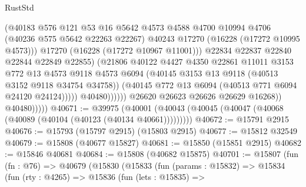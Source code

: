 \begin{lexlean}{RustStd}
\begin{coremodule}
                                      (@40183
                                        @576
                                        @121
                                        @53
                                        @16
                                        @5642
                                        @4573
                                        @4588
                                        @4700
                                        @10994
                                        @4706
                                        (@40236 @575 @5642 @22263 @22267)
                                        @40243
                                        @17270
                                        (@16228 (@17272 @10995 @4573)))
                                      @17270
                                      (@16228 (@17272 @10967 @11001)))
                                    @22834
                                    @22837
                                    @22840
                                    @22844
                                    @22849
                                    @22855)
                                  (@21806
                                    @40122
                                    @4427
                                    @4350
                                    @22861
                                    @11011
                                    @3153
                                    @772
                                    @13
                                    @4573
                                    @9118
                                    @4573
                                    @6094
                                    (@40145 @3153 @13 @9118 (@40513 @3152 @9118 @34754 @34758))
                                    (@40145 @772 @13 @6094 (@40513 @771 @6094 @24120 @24124)))))
                              @40480))))))
                  @26620
                  @26623
                  @26626
                  @26629
                  @16268))
              @40480)))))
@40671 := @39975
    (@40001 (@40043 (@40045 (@40047 (@40068 (@40089 (@40104 (@40123 (@40134 @40661)))))))))
@40672 := @15791 @2915
@40676 := @15793 (@15797 @2915) (@15803 @2915)
@40677 := @15812 @32549
@40679 := @15808 (@40677 @15827)
@40681 := @15850 (@15851 @2915)
@40682 := @15846 @40681
@40684 := @15808 (@40682 @15875)
@40701 := @15807
    (fun (fn : @76) =>
    @40679
      (@15830
        (@15833
          (fun (params : @15832) =>
          @15834
            (fun (rty : @4265) =>
            @15836
              (fun (lets : @15835) =>

\end{coremodule}
\end{lexlean}
